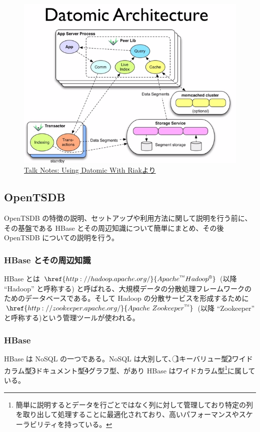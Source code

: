 \documentclass{scrartcl}
\begin{document}
\begin{figure}[htbp]
\centering
\includegraphics[width=15cm]{./datomic.png}
\caption{\href{http://endot.org/notes/2014-01-10-using-datomic-with-riak/datomic.png}{Talk Notes: Using Datomic With Riakより}}
\end{figure}

\newpage
\subsection{OpenTSDB}
\label{sec:org1e9d720}
OpenTSDB の特徴の説明、セットアップや利用方法に関して説明を行う前に、その基盤である HBase とその周辺知識について簡単にまとめ、その後 OpenTSDB についての説明を行う。\\

\subsubsection{HBase とその周辺知識}
\label{sec:org4790cbe}
HBase とは \(\href{http://hadoop.apache.org/}{Apache \textsuperscript{\texttrademark} Hadoop \textsuperscript{\textregistered}}\) (以降 ``Hadoop'' と呼称する) と呼ばれる、大規模データの分散処理フレームワークのためのデータベースである。そして Hadoop の分散サービスを形成するために \(\href{http://zookeeper.apache.org/}{Apache \ Zookeeper \textsuperscript{\texttrademark}}\) (以降 ``Zookeeper'' と呼称する)という管理ツールが使われる。\\
\subsubsection{HBase}
\label{sec:orgef16aa4}
HBase は NoSQL の一つである。NoSQL は大別して、\textcircled{\scriptsize 1}キーバリュー型\textcircled{\scriptsize 2}ワイドカラム型\textcircled{\scriptsize 3}ドキュメント型\textcircled{\scriptsize 4}グラフ型、があり HBase はワイドカラム型\footnote{簡単に説明するとデータを行ごとではなく列に対して管理しており特定の列を取り出して処理することに最適化されており、高いパフォーマンスやスケーラビリティを持っている。}に属している。\\
\end{document}
